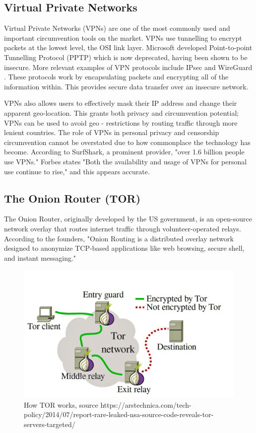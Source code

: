 \subsection{Virtual Private Networks}
Virtual Private Networks (VPNs) are one of the most commonly used and important circumvention tools on the market. VPNs use tunnelling to encrypt packets at the lowest level, the OSI link layer. Microsoft developed Point-to-point Tunnelling Protocol (PPTP) which is now deprecated, having been shown to be insecure. \cite{microsoft_ptpt} More relevant examples of VPN protocols include IPsec \cite{rfc6071} and WireGuard \cite{wireguard_docs}. These protocols work by encapsulating packets and encrypting all of the information within. This provides secure data transfer over an insecure network. \cite{vpn_secure_connection2020} 

VPNs also allows users to effectively mask their IP address and change their apparent geo-location. This grants both privacy and circumvention potential; VPNs can be used to avoid geo - restrictions by routing traffic through more lenient countries. The role of VPNs in personal privacy and censorship circumvention cannot be overstated due to how commonplace the technology has become. According to SurfShark, a prominent provider, "over 1.6 billion people use VPNs." \cite{surfshark_vpn_users} Forbes states "Both the availability and usage of VPNs for personal use continue to rise," and this appears accurate. \cite{forbes_vpn_stats}

\subsection{The Onion Router (TOR)}
The Onion Router, originally developed by the US government, is an open-source network overlay that routes internet traffic through volunteer-operated relays. According to the founders, "Onion Routing is a distributed overlay network designed to anonymize TCP-based applications like web browsing, secure shell, and instant messaging." \cite{dingledine2004tor}

\begin{figure}
    \centering
    \includegraphics[width=1\linewidth]{HowTorWorks.png}
    \caption{How TOR works, source https://arstechnica.com/tech-policy/2014/07/report-rare-leaked-nsa-source-code-reveals-tor-servers-targeted/}
    \label{fig:enter-label}
\end{figure}


